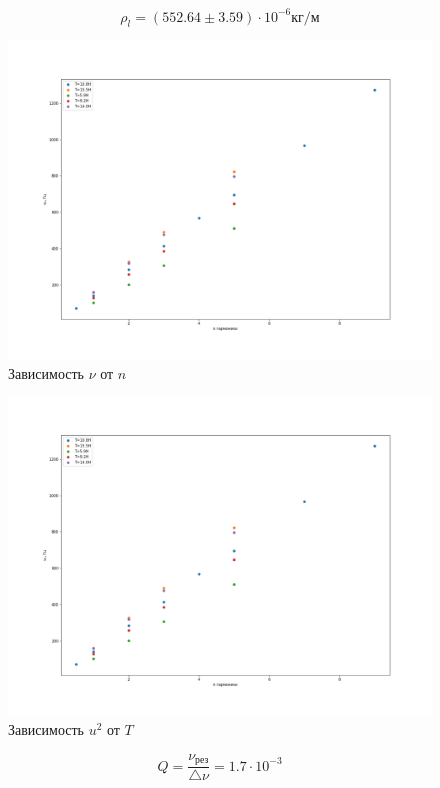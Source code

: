 \documentclass[a4paper,12pt]{article} %
\begin{document}
\begin{equation}
\rho_l = (552.64 \pm 3.59) \cdot  10^{-6} \text{кг/м}
\end{equation}
\begin{figure}[h!]
\begin{center}
\includegraphics[width=\textwidth]{nu от n}
\end{center}
\caption{Зависимость $\nu$ от $n$} \label{график}
\end{figure}

\begin{figure}[h!]
\begin{center}
\includegraphics[width=\textwidth]{u^2 от T }
\end{center}
\caption{Зависимость $u^2$ от $T$} \label{график}
\end{figure}
\begin{equation}
Q = \frac{\nu_\text{рез}}{\bigtriangleup \nu} = 1.7 \cdot 10^{-3}
\end{equation}
\end{document}
